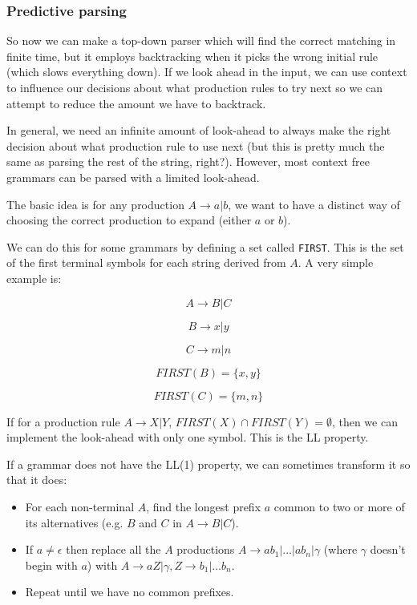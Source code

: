 \subsubsection{Predictive parsing}

So now we can make a top-down parser which will find the correct matching in
finite time, but it employs backtracking when it picks the wrong initial rule
(which slows everything down). If we look ahead in the input, we can use context
to influence our decisions about what production rules to try next so we can
attempt to reduce the amount we have to backtrack.

In general, we need an infinite amount of look-ahead to always make the right
decision about what production rule to use next (but this is pretty much the
same as parsing the rest of the string, right?). However, most context free
grammars can be parsed with a limited look-ahead.

The basic idea is for any production $A \rightarrow a | b$, we want to have a
distinct way of choosing the correct production to expand (either $a$ or $b$).

We can do this for some grammars by defining a set called \texttt{FIRST}. This
is the set of the first terminal symbols for each string derived from $A$. A
very simple example is:

\[
  A \rightarrow B | C
\]

\[
  B \rightarrow x | y
\]

\[
  C \rightarrow m | n
\]

\[
  FIRST(B) = \{x, y\}
\]

\[
  FIRST(C) = \{m, n\}
\]


If for a production rule $A \rightarrow X | Y$, $FIRST(X) \cap FIRST(Y) =
\emptyset$, then we can implement the look-ahead with only one symbol. This is
the LL property.

If a grammar does not have the LL(1) property, we can sometimes transform it so
that it does:

\begin{itemize}
  \item For each non-terminal $A$, find the longest prefix $a$ common to two or
  more of its alternatives (e.g. $B$ and $C$ in $A \rightarrow B | C$).
  \item If $a \neq \epsilon$ then replace all the $A$ productions
  $A \rightarrow ab_1 | \dots | ab_n | \gamma$ (where $\gamma$ doesn't begin
  with $a$) with $A \rightarrow aZ | \gamma, Z \rightarrow b_1 | \dots b_n$.
  \item Repeat until we have no common prefixes.
\end{itemize}

